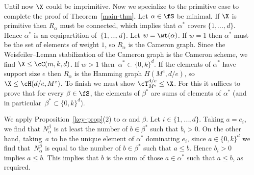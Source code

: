 Until now $\X$ could be imprimitive.
Now we specialize to the primitive case to complete the proof of Theorem~\ref{main-thm}.
Let $\alpha \in \fS$ be minimal.
If $\X$ is primitive then $R_\alpha$ must be connected,
which implies that $\alpha^*$ covers $\{1, \dots, d\}$.
Hence $\alpha^*$ is an equipartition of~$\{1, \dots ,d\}$.
Let $w = \wt(\alpha)$.
If $w = 1$ then $\alpha^*$ must be the set of elements of weight $1$, so $R_\alpha$ is the Cameron graph.
Since the Weisfeiler--Leman stabilization of the Cameron graph is the Cameron scheme, we find $\X \le \cC(m, k, d)$.
If $w > 1$ then~$\alpha^* \subset \{0, k\}^d$.
If the elements of $\alpha^*$ have support size $e$ 
then $R_\alpha$ is the Hamming graph $H(M^e, d/e)$, so $\X \le \cH(d/e, M^e)$.
To finish we must show $\cT_{M^e}^{d/e} \le \X$.
For this it suffices to prove that for every $\beta \in \fS$, the elements of $\beta^*$ are sums of elements of $\alpha^*$ (and in particular~$\beta^* \subset \{0, k\}^d$).

We apply Proposition~\ref{key-prop}(2) to $\alpha$ and $\beta$.
Let $i \in \{1, \dots, d\}$.
Taking $a = e_i$, we find that $N^\beta_\alpha$ is at least the number of $b \in \beta^*$ such that $b_i > 0$.
On the other hand, taking~$a$ to be the unique element of $\alpha^*$ dominating $e_i$,
since $a \in \{0,k\}^d$ we find that~$N^\beta_\alpha$ is equal to the number of $b \in \beta^*$ such that $a \le b$.
Hence $b_i > 0$ implies $a \le b$.
This implies that $b$ is the sum of those $a \in \alpha^*$ such that $a \le b$, as required.
